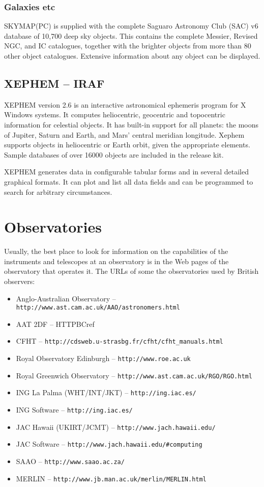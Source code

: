 \documentclass[twoside,11pt]{article}
\newcommand{\htmladdnormallink}[2]{#1}
\newcommand{\xlabel}[1]{}
\newcommand{\IRAFref}{\htmladdnormallink{IRAF}{http://star-www.rl.ac.uk/iraf/}}
\newcommand{\SKYMAPPCref}{\htmladdnormallink{SKYMAP(PC)}{http://www.skymap.com}}
\newcommand{\HTTPGref}{\htmladdnormallink{\tt http://www.ast.cam.ac.uk/AAO/astronomers.html}{http://www.ast.cam.ac.uk/AAO/astronomers.html}}
\newcommand{\HTTPHref}{\htmladdnormallink{\tt http://www.roe.ac.uk}{http://www.roe.ac.uk}}
\newcommand{\HTTPIref}{\htmladdnormallink{\tt http://www.ast.cam.ac.uk/RGO/RGO.html}{http://www.ast.cam.ac.uk/RGO/RGO.html}}
\newcommand{\HTTPJref}{\htmladdnormallink{\tt http://ing.iac.es/}{http://ing.iac.es/}}
\newcommand{\HTTPKref}{\htmladdnormallink{\tt http://www.jach.hawaii.edu/}{http://www.jach.hawaii.edu/}}
\newcommand{\HTTPLref}{\htmladdnormallink{\tt http://www.jach.hawaii.edu/\#{}computing}{http://www.jach.hawaii.edu/\#{}computing}}
\newcommand{\HTTPBZref}{\htmladdnormallink{\tt http://cdsweb.u-strasbg.fr/cfht/cfht\_{}manuals.html}{http://cdsweb.u-strasbg.fr/cfht/cfht\_{}manuals.html}}
\newcommand{\HTTPBAref}{\htmladdnormallink{\tt http://www.saao.ac.za/}{http://www.saao.ac.za/}}
\newcommand{\HTTPBBref}{\htmladdnormallink{\tt http://www.jb.man.ac.uk/merlin/MERLIN.html}{http://www.jb.man.ac.uk/merlin/MERLIN.html}}
\begin{document}
\subsubsection{Galaxies etc}

{\SKYMAPPCref} is supplied with the complete Saguaro Astronomy Club (SAC) v6 database
of 10,700 deep sky objects. This contains the complete Messier, Revised NGC, and IC
catalogues, together with the brighter objects from more than 80 other object
catalogues. Extensive information about any object can be displayed. 
 
\subsection{XEPHEM -- {\IRAFref}}   \xlabel{XEPHEM}
\label{sec:xephem}

XEPHEM version 2.6 is an interactive astronomical ephemeris program for X
Windows systems. It computes heliocentric, geocentric and topocentric
information for celestial objects. It has built-in support for all
planets: the moons of Jupiter, Saturn and Earth, and Mars' central meridian
longitude. Xephem supports objects in heliocentric or Earth orbit, given the
appropriate elements. Sample databases of over 16000 objects are included in
the release kit. 

XEPHEM generates data in configurable tabular forms and in several detailed
graphical formats. It can plot and list all data fields and can be
programmed to search for arbitrary circumstances.


\section{Observatories} \xlabel{OBSERVATORIES}
\label{sec:observatories}
 

Usually, the best place to look for information on the capabilities of the
instruments and telescopes at an observatory is in the Web pages of
the observatory that operates it. The URLs of some the observatories 
used by British observers:

\begin{itemize}
\item Anglo-Australian Observatory -- {\HTTPGref}
\item AAT 2DF -- {HTTPBCref}
\item CFHT -- {\HTTPBZref}
\item Royal Observatory Edinburgh -- {\HTTPHref}                                         
\item Royal Greenwich Observatory -- {\HTTPIref} 
\item ING La Palma (WHT/INT/JKT) -- {\HTTPJref} 
\item ING Software -- {\HTTPJref}
\item JAC Hawaii (UKIRT/JCMT) -- {\HTTPKref} 
\item JAC Software -- {\HTTPLref}
\item SAAO -- {\HTTPBAref}
\item MERLIN -- {\HTTPBBref}
\end {itemize}
\end{document}
